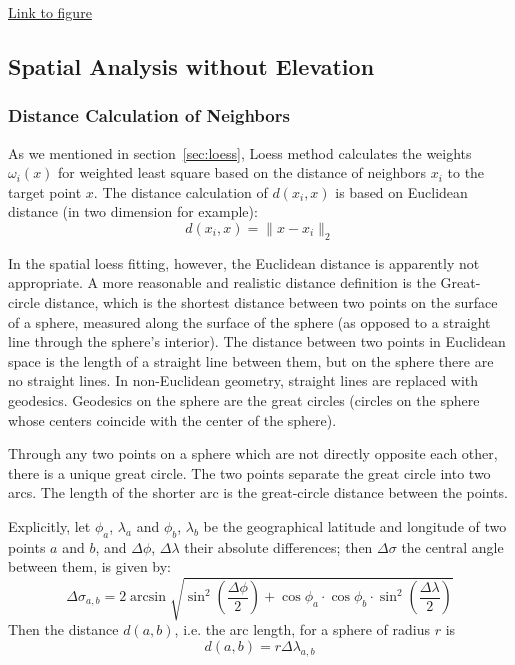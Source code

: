 \begin{framed}
\begin{center}
  \href{../plots/tmax.a1950.status.pdf}
  {Link to figure}
  \label{a1950.status}
\end{center}
\end{framed}


\subsection{Spatial Analysis without Elevation}

\subsubsection{Distance Calculation of Neighbors}

As we mentioned in section~\ref{sec:loess}, Loess method calculates the weights 
$\omega_i(x)$
for weighted least square based on the distance of neighbors $x_i$ to the target 
point $x$. The distance calculation of $d(x_i, x)$ is based on Euclidean distance 
(in two dimension for example):
$$
d(x_i, x) = \| x - x_i \|_2
$$
 
In the spatial loess fitting, however, the Euclidean distance is apparently not 
appropriate. A more reasonable and realistic distance definition is the Great-circle 
distance, which is the shortest distance between two points on the surface of a 
sphere, measured along the surface of the sphere (as opposed to a straight line 
through the sphere's interior). The distance between two points in Euclidean 
space is the length of a straight line between them, but on the sphere there are 
no straight lines. In non-Euclidean geometry, straight lines are replaced with 
geodesics. Geodesics on the sphere are the great circles (circles on the sphere 
whose centers coincide with the center of the sphere).

Through any two points on a sphere which are not directly opposite each other, 
there is a unique great circle. The two points separate the great circle into 
two arcs. The length of the shorter arc is the great-circle distance between the 
points\cite{greatcircle}.

Explicitly, let $\phi_a$, $\lambda_a$ and $\phi_b$, $\lambda_b$ be the geographical 
latitude and longitude of two points $a$ and $b$, and $\Delta \phi$, 
$\Delta \lambda$ their absolute differences; then $\Delta \sigma$ the central angle 
between them, is given by:
$$
\Delta \sigma_{a,b} = 2 \arcsin \sqrt{ \sin^2 ( \frac{\Delta \phi}{2} ) + \cos \phi_a \cdot \cos \phi_b \cdot \sin^2 ( \frac{\Delta \lambda}{2} )}
$$ 
Then the distance $d(a,b)$, i.e. the arc length, for a sphere of radius $r$ is
$$
d(a,b) = r \Delta \lambda_{a,b}
$$

